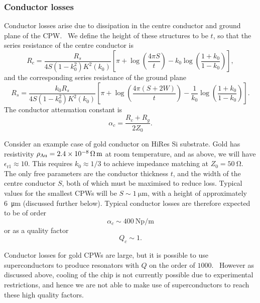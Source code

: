 \subsubsection*{Conductor losses}

Conductor losses arise due to dissipation in the centre conductor and ground
plane of the CPW.~\cite{Simons2004} We define the height of these structures to
be $t$, so that the series resistance of the centre conductor is
\begin{equation}
  R_c = \frac{R_s}{4 S(1-k_0^2)K^2(k_0)}\left[ \pi + \log\left(\frac{4\pi
  S}{t}\right) - k_0\log\left(\frac{1+k_0}{1-k_0}\right) \right],
\end{equation}
and the corresponding series resistance of the ground plane
\begin{equation}
  R_s = \frac{k_0 R_s}{4S(1-k_0^2)K^2(k_0)}\left[\pi +
  \log\left(\frac{4\pi(S+2W)}{t}\right) -
  \frac{1}{k_0}\log\left(\frac{1+k_0}{1-k_0}\right)\right].
\end{equation}
The conductor attenuation constant is
\begin{equation}
  \alpha_c = \frac{R_c +R_g}{2Z_0}.
\end{equation}

Consider an example case of gold conductor on HiRes Si substrate. Gold has
resistivity $\rho_\mathrm{Au} = \SI{2.4E-8}{\ohm\metre}$ at room temperature,
and as above, we will have $\epsilon_\mathrm{r1} \approx 10$. This requires $k_0
\approx 1/3$ to achieve impedance matching at $Z_0 = \SI{50}{\ohm}$. The only
free parameters are the conductor thickness $t$, and the width of the centre
conductor $S$, both of which must be maximised to reduce loss. Typical values
for the smallest CPWs will be $S\sim\SI{1}{\micro\metre}$,
%
%
with a height of approximately \SI{6}{\micro\metre}
(discussed further below). Typical conductor losses are therefore expected to be
of order
\begin{equation}
  \alpha_c \sim \SI{400}{\neper\per\metre}
\end{equation}
or as a quality factor
\begin{equation}
  Q_c \sim 1.
\end{equation}

Conductor losses for gold CPWs are large, but it is possible to use
superconductors to produce resonators with $Q$ on the order of
$1000$.~\cite{Booth1999, Wallraff2004} However as discussed above, cooling of
the chip is not currently possible due to experimental restrictions, and hence
we are not able to make use of superconductors to reach these high quality
factors.

